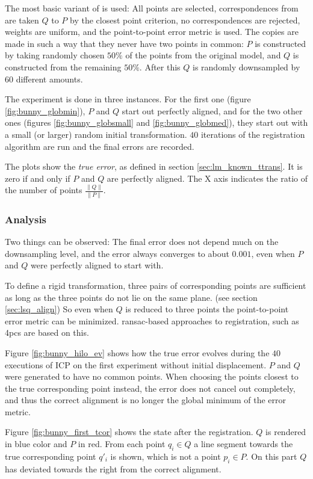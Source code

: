 The most basic variant of  is used: All points are selected, correspondences from are taken $Q$ to $P$ by the closest point criterion, no correspondences are rejected, weights are uniform, and the point-to-point error metric is used. The copies are made in such a way that they never have two points in common: $P$ is constructed by taking randomly chosen $50\%$ of the points from the original model, and $Q$ is constructed from the remaining $50\%$. After this $Q$ is randomly downsampled by $60$ different amounts.

The experiment is done in three instances. For the first one (figure \ref{fig:bunny_globmin}), $P$ and $Q$ start out perfectly aligned, and for the two other ones (figures \ref{fig:bunny_globsmall} and \ref{fig:bunny_globmed}), they start out with a small (or larger) random initial transformation. $40$ iterations of the registration algorithm are run and the final errors are recorded.

The plots show the \emph{true error}, as defined in section \ref{sec:lm_known_ttrans}. It is zero if and only if $P$ and $Q$ are perfectly aligned. The X axis indicates the ratio of the number of points $\frac{\|Q\|}{\|P\|}$.


\subsubsection{Analysis}
Two things can be observed: The final error does not depend much on the downsampling level, and the error always converges to about $0.001$, even when $P$ and $Q$ were perfectly aligned to start with.

To define a rigid transformation, three pairs of corresponding points are sufficient as long as the three points do not lie on the same plane. (see section \ref{sec:lsq_align}) So even when $Q$ is reduced to three points the point-to-point error metric can be minimized. \gls{ransac}-based approaches to registration, such as \gls{4pcs} are based on this.

Figure \ref{fig:bunny_hilo_ev} shows how the true error evolves during the $40$ executions of ICP on the first experiment without initial displacement. $P$ and $Q$ were generated to have no common points. When choosing the points closest to the true corresponding point instead, the error does not cancel out completely, and thus the correct alignment is no longer the global minimum of the error metric.

Figure \ref{fig:bunny_first_tcor} shows the state after the registration. $Q$ is rendered in blue color and $P$ in red. From each point $q_i \in Q$ a line segment towards the true corresponding point $q'_i$ is shown, which is not a point $p_i \in P$. On this part $Q$ has deviated towards the right from the correct alignment.

